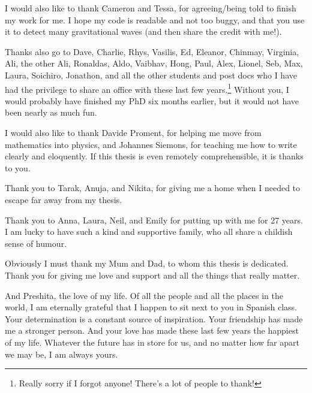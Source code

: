 \documentclass[11pt]{cuthesis}
\begin{document}
I would also like to thank Cameron and Tessa, for agreeing/being told to finish my work for me. I hope my code is readable and not too buggy, and that you use it to detect many gravitational waves (and then share the credit with me!). 

Thanks also go to Dave, Charlie, Rhys, Vasilis, Ed, Eleanor, Chinmay, Virginia,  Ali, the other Ali, Ronaldas, Aldo, Vaibhav, Hong, Paul, Alex, Lionel, Seb, Max, Laura, Soichiro, Jonathon, and all the other students and post docs who I have had the privilege to share an office with these last few years.\footnote{Really sorry if I forgot anyone! There's a lot of people to thank!} Without you, I would probably have finished my PhD six months earlier, but it would not have been nearly as much fun. 

I would also like to thank Davide Proment, for helping me move from mathematics into physics, and Johannes Siemons, for teaching me how to write clearly and eloquently. If this thesis is even remotely comprehensible, it is thanks to you. 

Thank you to Tarak, Anuja, and Nikita, for giving me a home when I needed to escape far away from my thesis. 

Thank you to Anna, Laura, Neil, and Emily for putting up with me for 27 years. I am lucky to have such a kind and supportive family, who all share a childish sense of humour. 

Obviously I must thank my Mum and Dad, to whom this thesis is dedicated. Thank you for giving me love and support and all the things that really matter.  

And Preshita, the love of my life. Of all the people and all the places in the world, I am eternally grateful that I happen to sit next to you in Spanish class. Your determination is a constant source of inspiration. Your friendship has made me a stronger person. And your love has made these last few years the happiest of my life. Whatever the future has in store for us, and no matter how far apart we may be, I am always yours. 
  
\end{document}
